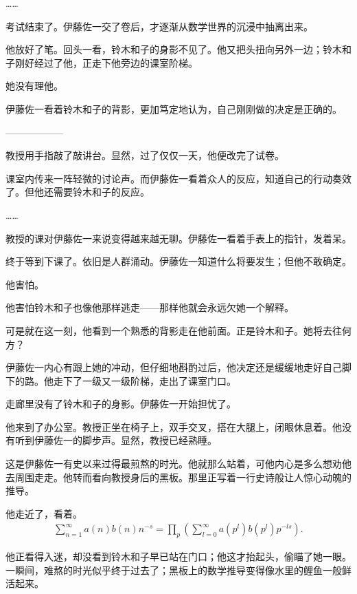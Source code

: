 ……

考试结束了。伊藤佐一交了卷后，才逐渐从数学世界的沉浸中抽离出来。

他放好了笔。回头一看，铃木和子的身影不见了。他又把头扭向另外一边；铃木和子刚好经过了他，正走下他旁边的课室阶梯。

她没有理他。

伊藤佐一看着铃木和子的背影，更加笃定地认为，自己刚刚做的决定是正确的。

\begin{center}
——————
\end{center}


教授用手指敲了敲讲台。显然，过了仅仅一天，他便改完了试卷。



课室内传来一阵轻微的讨论声。而伊藤佐一看着众人的反应，知道自己的行动奏效了。但他还需要铃木和子的反应。

……

教授的课对伊藤佐一来说变得越来越无聊。伊藤佐一看着手表上的指针，发着呆。

终于等到下课了。依旧是人群涌动。伊藤佐一知道什么将要发生；但他不敢确定。

他害怕。

他害怕铃木和子也像他那样逃走——那样他就会永远欠她一个解释。

可是就在这一刻，他看到一个熟悉的背影走在他前面。正是铃木和子。她将去往何方？

伊藤佐一内心有跟上她的冲动，但仔细地斟酌过后，他决定还是缓缓地走好自己脚下的路。他走下了一级又一级阶梯，走出了课室门口。

走廊里没有了铃木和子的身影。伊藤佐一开始担忧了。

他来到了办公室。教授正坐在椅子上，双手交叉，搭在大腿上，闭眼休息着。他没有听到伊藤佐一的脚步声。显然，教授已经熟睡。

这是伊藤佐一有史以来过得最煎熬的时光。他就那么站着，可他内心是多么想劝他去周围走走。他转而看向教授身后的黑板。那里正写着一行史诗般让人惊心动魄的推导。

他走近了，看着。
\begin{gather*}
\sum_{n=1}^{\infty}a(n)b(n)n^{-s}=\prod_p\left(\sum_{l=0}^{\infty}a(p^l)b(p^l)p^{-ls}\right).
\end{gather*}

他正看得入迷，却没看到铃木和子早已站在门口；他这才抬起头，偷瞄了她一眼。一瞬间，难熬的时光似乎终于过去了；黑板上的数学推导变得像水里的鲤鱼一般鲜活起来。

